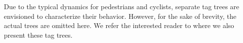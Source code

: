 Due to the typical dynamics for pedestrians and cyclists, separate tag trees are envisioned to characterize their behavior. However, for the sake of brevity, the actual trees are omitted here. We refer the interested reader to \autocite{degelder2019scenariocategories} where we also present these tag trees.
%
%
%



